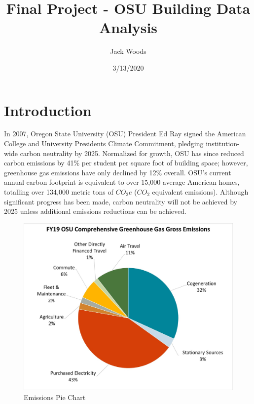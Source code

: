 \documentclass[
]{article}
\title{Final Project - OSU Building Data Analysis}
\author{Jack Woods}
\date{3/13/2020}
\begin{document}
\maketitle

\hypertarget{introduction}{%
\section{Introduction}\label{introduction}}

In 2007, Oregon State University (OSU) President Ed Ray signed the
American College and University Presidents Climate Commitment, pledging
institution-wide carbon neutrality by 2025. Normalized for growth, OSU
has since reduced carbon emissions by 41\% per student per square foot
of building space; however, greenhouse gas emissions have only declined
by 12\% overall. OSU's current annual carbon footprint is equivalent to
over 15,000 average American homes, totalling over 134,000 metric tons
of \(CO_2e\) (\(CO_2\) equivalent emissions). Although significant
progress has been made, carbon neutrality will not be achieved by 2025
unless additional emissions reductions can be achieved.

\begin{figure}
\centering
\includegraphics{../documents/pie_gross_emissions.jpg}
\caption{Emissions Pie Chart}
\end{figure}
\end{document}
